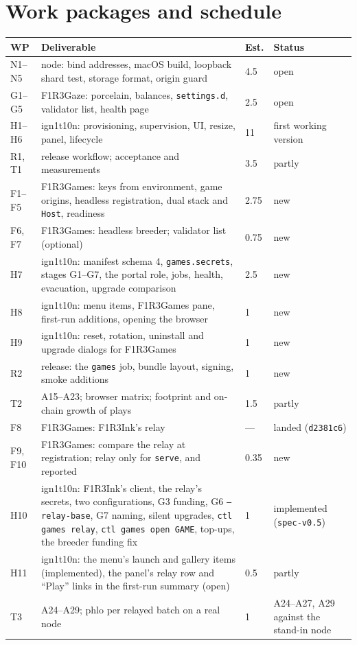 \documentclass[11pt]{article}
\theoremstyle{definition}
\theoremstyle{remark}
\newcommand{\code}[1]{\texttt{#1}}
\newcommand{\Gz}{F1R3Gaze}
\newcommand{\Hr}{ign1t10n}
\newcommand{\Gm}{F1R3Games}
\begin{document}
\section{Work packages and schedule}\label{sec:plan}

\begin{center}\small
\renewcommand{\arraystretch}{1.15}
\begin{tabularx}{\linewidth}{@{}>{\raggedright\arraybackslash}p{1.3cm}X p{0.9cm}>{\raggedright\arraybackslash}p{2.2cm}@{}}
\toprule
WP & Deliverable & Est. & Status\\
\midrule
N1--N5 & node: bind addresses, macOS build, loopback shard test, storage format, origin guard & 4.5 & open\\
G1--G5 & \Gz{}: porcelain, balances, \code{settings.d}, validator list, health page & 2.5 & open\\
H1--H6 & \Hr{}: provisioning, supervision, UI, resize, panel, lifecycle & 11 & first working version\\
R1, T1 & release workflow; acceptance and measurements & 3.5 & partly\\
\midrule
F1--F5 & \Gm{}: keys from environment, game origins, headless registration, dual stack and \code{Host}, readiness & 2.75 & new\\
F6, F7 & \Gm{}: headless breeder; validator list (optional) & 0.75 & new\\
H7 & \Hr{}: manifest schema 4, \code{games.secrets}, stages G1--G7, the portal role, jobs, health, evacuation, upgrade comparison & 2.5 & new\\
H8 & \Hr{}: menu items, \Gm{} pane, first-run additions, opening the browser & 1 & new\\
H9 & \Hr{}: reset, rotation, uninstall and upgrade dialogs for \Gm{} & 1 & new\\
R2 & release: the \code{games} job, bundle layout, signing, smoke additions & 1 & new\\
T2 & A15--A23; browser matrix; footprint and on-chain growth of plays & 1.5 & partly\\
\midrule
F8 & \Gm{}: F1R3Ink's relay & --- & landed (\code{d2381c6})\\
F9, F10 & \Gm{}: compare the relay at registration; relay only for \code{serve}, and reported & 0.35 & new\\
H10 & \Hr{}: F1R3Ink's client, the relay's secrets, two configurations, G3 funding, G6 \code{--relay-base}, G7 naming, silent upgrades, \code{ctl games relay}, \code{ctl games open GAME}, top-ups, the breeder funding fix & 1 & implemented (\code{spec-v0.5})\\
H11 & \Hr{}: the menu's launch and gallery items (implemented), the panel's relay row and ``Play'' links in the first-run summary (open) & 0.5 & partly\\
T3 & A24--A29; phlo per relayed batch on a real node & 1 & A24--A27, A29 against the stand-in node\\
\bottomrule
\end{tabularx}
\end{center}
\end{document}
